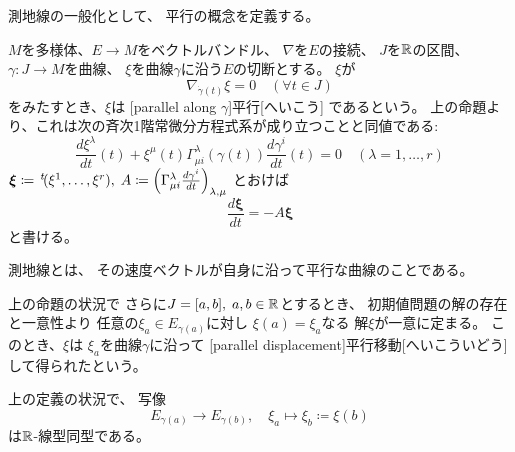 \documentclass[report]{jlreq}
\begin{document}
測地線の一般化として、
平行の概念を定義する。

\begin{definition}[平行]
    $M$を多様体、$E \to M$をベクトルバンドル、
    $\nabla$を$E$の接続、
    $J$を$\mathbb{R}$の区間、
    $\gamma \colon J \to M$を{\smooth}曲線、
    $\xi$を曲線$\gamma$に沿う$E$の切断とする。
    $\xi$が
    \begin{equation}
        \nabla_{\dot{\gamma}(t)} \xi = 0
            \quad
            (\forall t \in J)
    \end{equation}
    をみたすとき、$\xi$は
    [parallel along $\gamma$]{平行}[へいこう]
    であるという。
    上の命題より、これは次の斉次1階常微分方程式系が成り立つことと同値である:
    \begin{equation}
        \frac{d\xi^\lambda}{dt}(t)
            + \xi^\mu (t)
            \Gamma^\lambda_{\mu i} (\gamma(t))
            \frac{d\gamma^i}{dt}(t)
            = 0
            \quad
            (\lambda = 1, \ldots, r)
    \end{equation}
    $\bm{\xi} \coloneqq \,{}^{t}\!(\xi^1, \dots, \xi^r), \;
    A \coloneqq \left(
        \Gamma^{\lambda}_{\mu i} \frac{d\gamma^i}{dt}
    \right)_{\lambda, \mu}$
    とおけば
    \begin{equation}
        \frac{d\bm{\xi}}{dt} = - A \bm{\xi}
    \end{equation}
    と書ける。
\end{definition}

\begin{remark}
    測地線とは、
    その速度ベクトルが自身に沿って平行な曲線のことである。
\end{remark}

\begin{definition}[平行移動]
    上の命題の状況で
    さらに$J = [a, b], \; a, b \in \mathbb{R}$とするとき、
    初期値問題の解の存在と一意性より
    任意の$\xi_a \in E_{\gamma(a)}$に対し
    $\xi(a) = \xi_a$なる
    解$\xi$が一意に定まる。
    このとき、$\xi$は
    $\xi_a$を曲線$\gamma$に沿って
    [parallel displacement]{平行移動}[へいこういどう]
    して得られたという。
\end{definition}

\begin{proposition}
    上の定義の状況で、
    写像
    \begin{equation}
        E_{\gamma(a)} \to E_{\gamma(b)},
        \quad
        \xi_a \mapsto \xi_b \coloneqq \xi(b)
    \end{equation}
    は$\mathbb{R}$-線型同型である。
\end{proposition}
\end{document}
